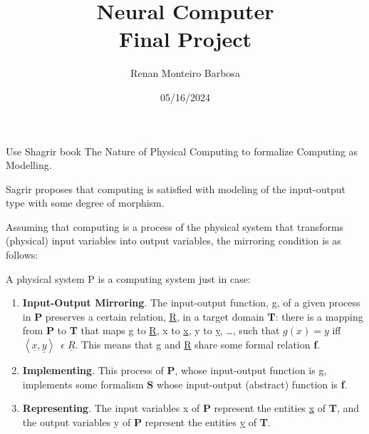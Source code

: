 \documentclass{amsart}
\begin{document}
\title{Neural Computer\\{\bf Final Project}}%
\author{Renan Monteiro Barbosa}%
\date{05/16/2024}

\maketitle
\clearpage


Use Shagrir book The Nature of Physical Computing to formalize Computing as Modelling.


Sagrir proposes that computing is satisfied with modeling of the input-output type with some degree of morphism.

Assuming that computing is a process of the physical system that transforms (physical) input variables into output variables, the mirroring condition is as follows:




A physical system P is a computing system just in case:

\begin{enumerate}
    \item \textbf{Input-Output Mirroring}. The input-output function, g, of a given process in \textbf{P} preserves a certain relation, \underline{R}, in a target domain \textbf{T}: there is a mapping from \textbf{P} to \textbf{T} that maps g to \underline{R}, x to \underline{x}, y to \underline{y}, \dots , such that $g(x) = y$ iff $\left\langle \underline{x},\underline{y} \right\rangle\ \; \epsilon \; \underline{R}$. This means that g and \underline{R} share some formal relation \textbf{f}.
    \item \textbf{Implementing}. This process of \textbf{P}, whose input-output function is g, implements some formalism \textbf{S} whose input-output (abstract) function is \textbf{f}.
    \item \textbf{Representing}. The input variables x of \textbf{P} represent the entities \underline{x} of \textbf{T}, and the output variables y of \textbf{P} represent the entities \underline{y} of \textbf{T}.
\end{enumerate}
\end{document}
